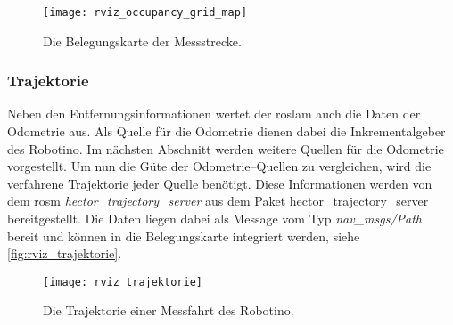 \begin{figure}[h]
	\centering
	\texttt{[image: rviz\_occupancy\_grid\_map]}
	\caption{Die Belegungskarte der Messstrecke.}
	\label{fig:rviz_occupancy_grid_map}
\end{figure}
 

\begin{comment}
--------------------------------------------------------------------------------
- \url{http://wiki.ros.org/hector_trajectory_server}
- \url{http://docs.ros.org/api/nav_msgs/html/msg/Path.html}
\end{comment}
\subsubsection{Trajektorie}

Neben den Entfernungsinformationen wertet der \Gls{roslam} auch die Daten der Odometrie aus. Als Quelle für die Odometrie dienen dabei die Inkrementalgeber des Robotino. Im nächsten Abschnitt werden weitere Quellen für die Odometrie vorgestellt. Um nun die Güte der Odometrie--Quellen zu vergleichen, wird die verfahrene Trajektorie jeder Quelle benötigt. Diese Informationen werden von dem \Gls{rosm} \textit{hector\_trajectory\_server} aus dem Paket {hector\_trajectory\_server} bereitgestellt. Die Daten liegen dabei als Message vom Typ \textit{nav\_msgs/Path} bereit und können in die Belegungskarte integriert werden, siehe \autoref{fig:rviz_trajektorie}.

\begin{figure}[h]
	\centering
	\texttt{[image: rviz\_trajektorie]}
	\caption{Die Trajektorie einer Messfahrt des Robotino.}
	\label{fig:rviz_trajektorie}
\end{figure}


